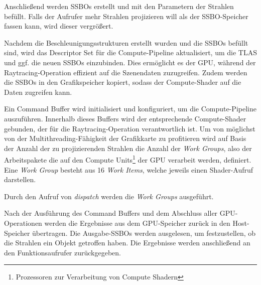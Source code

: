 \documentclass[11pt]{scrartcl}
\begin{document}
	Anschließend werden SSBOs erstellt und mit den Parametern der Strahlen befüllt. Falls der Aufrufer mehr Strahlen projizieren will als der SSBO-Speicher fassen kann, wird dieser vergrößert.
	
	Nachdem die Beschleunigungsstrukturen erstellt wurden und die SSBOs befüllt sind, wird das Descriptor Set für die Compute-Pipeline aktualisiert, um die TLAS und ggf. die neuen SSBOs einzubinden. Dies ermöglicht es der GPU, während der Raytracing-Operation effizient auf die Szenendaten zuzugreifen. Zudem werden die SSBOs in den Grafikspeicher kopiert, sodass der Compute-Shader auf die Daten zugreifen kann.
	
	Ein Command Buffer wird initialisiert und konfiguriert, um die Compute-Pipeline auszuführen. Innerhalb dieses Buffers wird der entsprechende Compute-Shader gebunden, der für die Raytracing-Operation verantwortlich ist. Um von möglichst von der Multithreading-Fähigkeit der Grafikkarte zu profitieren wird auf Basis der Anzahl der zu projizierenden Strahlen die Anzahl der \textit{Work Groups}, also der Arbeitspakete die auf den Compute Units\footnote{Prozessoren zur Verarbeitung von Compute Shadern} der GPU verarbeit werden, definiert. Eine \textit{Work Group} besteht aus 16 \textit{Work Items}, welche jeweils einen Shader-Aufruf darstellen.
	
	Durch den Aufruf von \textit{dispatch} werden die \textit{Work Groups} ausgeführt.
	
	Nach der Ausführung des Command Buffers und dem Abschluss aller GPU-Operationen werden die Ergebnisse aus dem GPU-Speicher zurück in den Host-Speicher übertragen. Die Ausgabe-SSBOs werden ausgelesen, um festzustellen, ob die Strahlen ein Objekt getroffen haben. Die Ergebnisse werden anschließend an den Funktionsaufrufer zurückgegeben.
	
\end{document}
